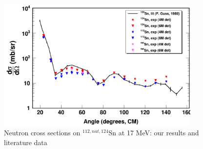\begin{figure}
    \begin{center}
        \includegraphics[width = 0.9\textwidth]{figures/neutronECS_Sn_17MeV.png}
        \caption{Neutron \el cross sections on $^{112,nat,124}$Sn at 17
    MeV: our results and literature data} \label{SnECS_17MeV}
\end{center}
\end{figure}

\afterpage{\clearpage}
